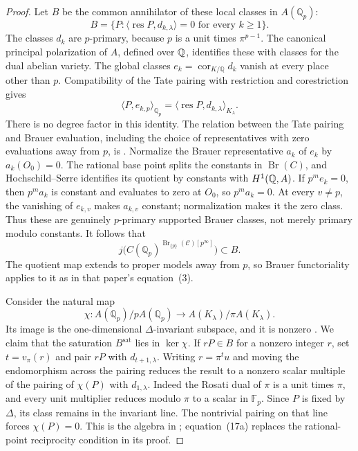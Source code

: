 \begin{proof}
Let $B$ be the common annihilator of these local classes in
$A(\mathbb Q_p)$:
\[
 B=\{P:\langle\operatorname{res}P,d_{k,\lambda}\rangle=0
                     \text{ for every }k\ge1\}.
\]
The classes $d_k$ are $p$-primary, because $p$ is a unit times
$\pi^{p-1}$. The canonical principal polarization of $A$, defined
 over $\mathbb Q$, identifies these with classes for the dual abelian variety.
The global classes $e_k=\operatorname{cor}_{K/\mathbb Q}d_k$
vanish at every place other than $p$.  Compatibility of the Tate
pairing with restriction and corestriction gives
\[
 \langle P,e_{k,p}\rangle_{\mathbb Q_p}
       =\langle\operatorname{res}P,d_{k,\lambda}\rangle_{K_\lambda}.
\]
There is no degree factor in this identity.  The relation between
the Tate pairing and Brauer evaluation, including the choice of
representatives with zero evaluations away from $p$, is
\citet[Lemma~1 and equation~(5), author pp.~4--5]{McCallum2001Brauer}.
Normalize the Brauer representative $a_k$ of $e_k$ by
$a_k(O_0)=0$. The rational base point splits the constants in
$\operatorname{Br}(C)$, and Hochschild--Serre identifies its quotient
by constants with $H^1(\mathbb Q,A)$. If $p^me_k=0$, then $p^ma_k$ is
constant and evaluates to zero at $O_0$, so $p^ma_k=0$. At every
$v\ne p$, the vanishing of $e_{k,v}$ makes $a_{k,v}$ constant;
normalization makes it the zero class. Thus these are genuinely
$p$-primary supported Brauer classes, not merely primary modulo constants.
It follows that
\[
 j\bigl(C(\mathbb Q_p)^{\operatorname{Br}_{\{p\}}(\mathcal C)[p^\infty]}\bigr)
       \subset B.                                      \tag{17a}
\]
The quotient map extends to proper models away from $p$, so Brauer
functoriality applies to it as in that paper's equation~(3).

Consider the natural map
\[
 \chi:A(\mathbb Q_p)/pA(\mathbb Q_p)
                \longrightarrow A(K_\lambda)/\pi A(K_\lambda).
\]
Its image is the one-dimensional $\Delta$-invariant subspace,
and it is nonzero
\citep[Corollary~2 and Proposition~5, pp.~574--575]{McCallum1994}.
We claim that the saturation $B^{\mathrm{sat}}$ lies in
$\ker\chi$.  If $rP\in B$ for a nonzero integer $r$, set
$t=v_\pi(r)$ and pair $rP$ with $d_{t+1,\lambda}$.
Writing $r=\pi^tu$ and moving the endomorphism across the pairing
reduces the result to a nonzero scalar multiple of the pairing
of $\chi(P)$ with $d_{1,\lambda}$.  Indeed the Rosati dual of
$\pi$ is a unit times $\pi$, and every unit multiplier reduces
modulo $\pi$ to a scalar in $\mathbb F_p$.
Since $P$ is fixed by $\Delta$, its class remains in the invariant
line.  The nontrivial pairing on that line forces $\chi(P)=0$.
This is the algebra in
\citet[Theorem~3, pp.~575--576]{McCallum1994}; equation~(17a)
replaces the rational-point reciprocity condition in its proof.


\end{proof}
